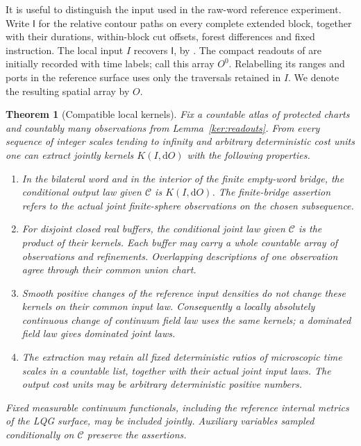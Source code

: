 \documentclass[11pt]{article}
\numberwithin{equation}{section}
\newtheorem{theorem}{Theorem}[section]
\theoremstyle{definition}
\theoremstyle{remark}
\newcommand{\dd}{\mathrm d}
\newcommand{\1}{\mathbf 1}
\begin{document}
It is useful to distinguish the input used in the raw-word reference
experiment. Write \(\mathsf I\) for the relative contour paths on every
complete extended block, together with their durations, within-block
cut offsets, forest
differences and fixed instruction. The local input \(I\) recovers
\(\mathsf I\), by . The compact readouts of
 are initially recorded with time labels; call this
array \(O^0\). Relabelling its ranges and ports in the reference surface
uses only the traversals retained in \(I\). We denote the resulting
spatial array by \(O\).

\begin{theorem}[Compatible local kernels]\label{ker:local-kernels}
Fix a countable atlas of protected charts and countably many
observations from Lemma~\ref{ker:readouts}.  From every sequence of
integer scales tending to infinity and arbitrary deterministic cost
units one can extract jointly kernels \(K(I,\dd O)\) with the following
properties.
\begin{enumerate}
\item In the bilateral word and in the interior of the finite
empty-word bridge, the conditional output law given \(\mathcal C\)
is \(K(I,\dd O)\).  The finite-bridge assertion refers to the actual
joint finite-sphere observations on the chosen subsequence.
\item For disjoint closed real buffers, the conditional joint law
given \(\mathcal C\) is the product of their kernels.  Each buffer may
carry a whole countable array of observations and refinements.
Overlapping descriptions of one observation agree through their
common union chart.
\item Smooth positive changes of the reference input densities do
not change these kernels on their common input law.  Consequently a
locally absolutely continuous change of continuum field law uses the
same kernels; a dominated field law gives dominated joint laws.
\item The extraction may retain all fixed deterministic ratios of
microscopic time scales in a countable list, together with their
actual joint input laws. The output cost units may be arbitrary
deterministic positive numbers.
\end{enumerate}
Fixed measurable continuum functionals, including the reference
internal metrics of the LQG surface, may be included jointly. Auxiliary
variables sampled conditionally on \(\mathcal C\) preserve the assertions.
\end{theorem}
\end{document}

